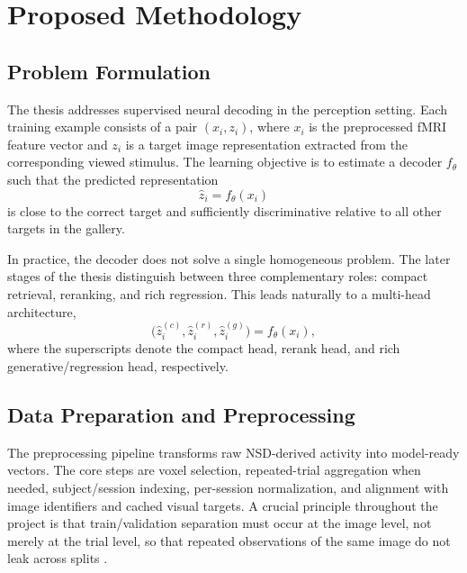 
\chapter{Proposed Methodology}
\label{chap:methodology}

\section{Problem Formulation}

The thesis addresses supervised neural decoding in the perception setting. Each training example consists of a pair $(x_i, z_i)$, where $x_i$ is the preprocessed fMRI feature vector and $z_i$ is a target image representation extracted from the corresponding viewed stimulus. The learning objective is to estimate a decoder $f_{\theta}$ such that the predicted representation
\begin{equation}
\hat{z}_i = f_{\theta}(x_i)
\label{eq:decoder_prediction}
\end{equation}
is close to the correct target and sufficiently discriminative relative to all other targets in the gallery.

In practice, the decoder does not solve a single homogeneous problem. The later stages of the thesis distinguish between three complementary roles: compact retrieval, reranking, and rich regression. This leads naturally to a multi-head architecture,
\begin{equation}
\big(\hat{z}^{(c)}_i, \hat{z}^{(r)}_i, \hat{z}^{(g)}_i\big) = f_{\theta}(x_i),
\label{eq:multihead_decoder}
\end{equation}
where the superscripts denote the compact head, rerank head, and rich generative/regression head, respectively.

\section{Data Preparation and Preprocessing}

The preprocessing pipeline transforms raw NSD-derived activity into model-ready vectors. The core steps are voxel selection, repeated-trial aggregation when needed, subject/session indexing, per-session normalization, and alignment with image identifiers and cached visual targets. A crucial principle throughout the project is that train/validation separation must occur at the image level, not merely at the trial level, so that repeated observations of the same image do not leak across splits \cite{Allen2022}.

